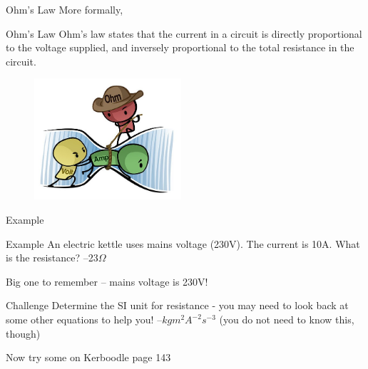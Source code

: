 \documentclass[../Main.tex]{subfiles}
\begin{document}
\begin{frame}{Ohm's Law}
    More formally, 
    
    \begin{block}{Ohm's Law}
    Ohm's law states that the current in a circuit is directly proportional to the voltage supplied, and inversely proportional to the total resistance in the circuit.
    \end{block}
    \begin{figure}
        \centering
        \includegraphics[height=4.5cm]{Electricity_Images/ohms_law.jpg}
    \end{figure}
\end{frame}

\begin{frame}{Example}
    \begin{exampleblock}{Example}
    An electric kettle uses mains voltage (230V). The current is 10A. What is the resistance? \pause
    --23$\Omega$
    \end{exampleblock}
    Big one to remember -- mains voltage is 230V!
    \pause
    \begin{exampleblock}{Challenge}
    Determine the SI unit for resistance - you may need to look back at some other equations to help you! \pause 
    --$kgm^2A^{-2}s^{-3}$ {\tiny(you do not need to know this, though)}
    \end{exampleblock}
    \pause
    Now try some on Kerboodle page 143
\end{frame}
\end{document}
